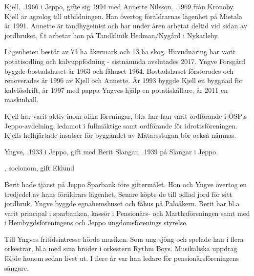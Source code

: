
Kjell, .1966 i Jeppo, gifte sig 1994 med Annette  Nilsson, .1969 från Kronoby. Kjell är agrolog till utbildningen. Han övertog föräldrarnas lägenhet på Mietala år 1991. Annette är tandhygeinist och har under åren arbetat deltid vid sidan av jordbruket, f.t arbetar hon på Tandklinik Hedman/Nygård i Nykarleby.


\begin{jhchildren}
  \item {}
  \item {}
  \item {}
\end{jhchildren}
Lägenheten består av 73 ha åkermark och 13 ha skog. Huvudnäring har varit potatisodling och kalvuppfödning - sistnämnda avslutades 2017. Yngve Forsgård byggde bostadshuset år 1963 och fähuset 1964. Bostadshuset förstorades och renoverades år 1996 av Kjell och Annette. År 1993 byggde Kjell en byggnad för kalvlösdrift, år 1997 med pappa Yngves hjälp en potatiskällare, år 2011 en maskinhall.

Kjell har varit aktiv inom olika föreningar, bl.a har han varit ordförande i ÖSP:s Jeppo-avdelning, ledamot i fullmäktige  samt ordförande för idrottsföreningen. Kjells helhjärtade insatser för byggandet av Måtarsstugan bör också nämnas.


Yngve, .1933 i Jeppo, gift med Berit Slangar, .1939 på Slangar i Jeppo.
\begin{jhchildren}
  \item {}
  \item {}, socionom, gift Eklund
\end{jhchildren}
Berit hade tjänst på Jeppo Sparbank före giftermålet. Hon och Yngve övertog en tredjedel av hans föräldrars lägenhet. Senare köpte de till odlad jord för sitt jordbruk. Yngve byggde egnahemshuset och fähus på Paloåkern. Berit har bl.a varit principal i sparbanken, kassör i Pensionärs- och Marthaföreningen samt med i Hembygdsföreningens och Jeppo ungdomsförenings styrelse.

Till Yngves fritidsintresse hörde musiken. Som ung sjöng och spelade han i flera orkestrar, bl.a med sina bröder i orkestern Rythm Boys. Musikaliska uppdrag följde honom sedan livet ut. I flere år var han ledare för pensionärsföreningens sångare.

